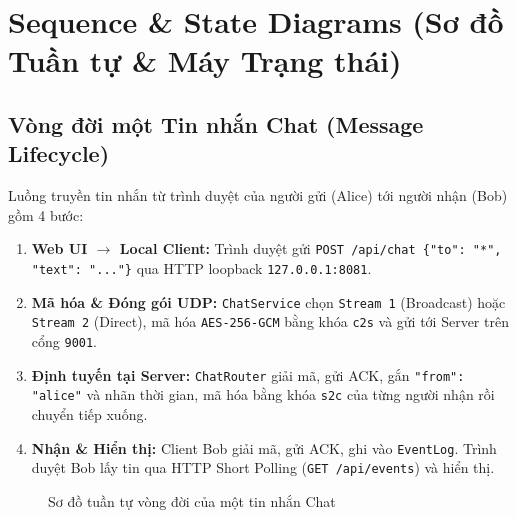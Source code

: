 \section{Sequence \& State Diagrams (Sơ đồ Tuần tự \& Máy Trạng thái)}

\subsection{Vòng đời một Tin nhắn Chat (Message Lifecycle)}
Luồng truyền tin nhắn từ trình duyệt của người gửi (Alice) tới người nhận (Bob) gồm 4 bước:
\begin{enumerate}
    \item \textbf{Web UI $\rightarrow$ Local Client:} Trình duyệt gửi \texttt{POST /api/chat \{"to": "*", "text": "..."\}} qua HTTP loopback \texttt{127.0.0.1:8081}.
    \item \textbf{Mã hóa \& Đóng gói UDP:} \texttt{ChatService} chọn \texttt{Stream 1} (Broadcast) hoặc \texttt{Stream 2} (Direct), mã hóa \texttt{AES-256-GCM} bằng khóa \texttt{c2s} và gửi tới Server trên cổng \texttt{9001}.
    \item \textbf{Định tuyến tại Server:} \texttt{ChatRouter} giải mã, gửi ACK, gắn \texttt{"from": "alice"} và nhãn thời gian, mã hóa bằng khóa \texttt{s2c} của từng người nhận rồi chuyển tiếp xuống.
    \item \textbf{Nhận \& Hiển thị:} Client Bob giải mã, gửi ACK, ghi vào \texttt{EventLog}. Trình duyệt Bob lấy tin qua HTTP Short Polling (\texttt{GET /api/events}) và hiển thị.
\end{enumerate}

\begin{figure}[H]
    \centering
    \caption{Sơ đồ tuần tự vòng đời của một tin nhắn Chat}
    \label{fig:seq_message}
\end{figure}

